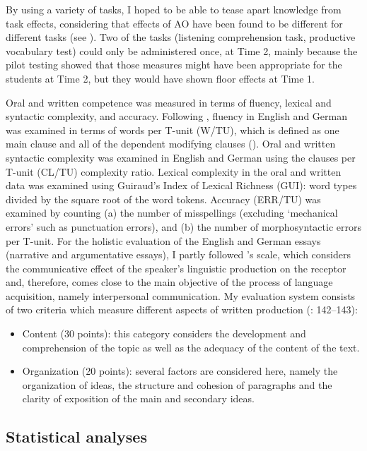 \documentclass[output=paper,modfonts,nonflat,newtxmath]{langsci/langscibook}
\begin{document}
By using a variety of tasks, I hoped to be able to tease apart knowledge from task effects, considering that effects of AO have been found to be different for different tasks (see \citealt{Pfenninger2017}). Two of the tasks (listening comprehension task, productive vocabulary test) could only be administered once, at Time 2, mainly because the pilot testing showed that those measures might have been appropriate for the students at Time 2, but they would have shown floor effects at Time 1.


Oral and written competence was measured in terms of fluency, lexical and syntactic complexity, and accuracy. Following \citet{Wolfe-QuinteroEtAl1998}, fluency in English and German was examined in terms of words per T-unit (W/TU), which is defined as one main clause and all of the dependent modifying clauses (\citealt{EllisBarkhuizen2005}). Oral and written syntactic complexity was examined in English and German using the clauses per T-unit (CL/TU) complexity ratio. Lexical complexity in the oral and written data was examined using Guiraud’s Index of Lexical Richness (GUI): word types divided by the square root of the word tokens. Accuracy (ERR/TU) was examined by counting (a) the number of misspellings (excluding ‘mechanical errors’ such as punctuation errors), and (b) the number of morphosyntactic errors per T-unit. For the holistic evaluation of the English and German essays (narrative and argumentative essays), I partly followed \citealt{JacobsEtAl1981}'s scale, which considers the communicative effect of the speaker’s linguistic production on the receptor and, therefore, comes close to the main objective of the process of language acquisition, namely interpersonal communication. My evaluation system consists of two criteria which measure different aspects of written production (\citealt{LasagabasterEtAl2003}: 142--143):


\begin{itemize}
\item
Content (30 points): this category considers the development and comprehension of the topic as well as the adequacy of the content of the text.

\item
Organization (20 points): several factors are considered here, namely the organization of ideas, the structure and cohesion of paragraphs and the clarity of exposition of the main and secondary ideas.

\end{itemize}

\subsection{Statistical analyses}
\end{document}
